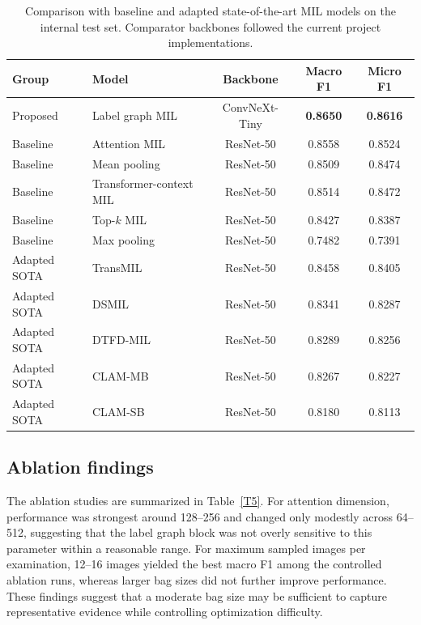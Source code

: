 \documentclass[Afour,sagev,times]{sagej}
\begin{document}
\begin{table}[h]
\small\sf\centering
\caption{Comparison with baseline and adapted state-of-the-art MIL models on the internal test set. Comparator backbones followed the current project implementations.\label{T4}}
\begin{tabular}{llccc}
\toprule
Group & Model & Backbone & Macro F1 & Micro F1 \\
\midrule
Proposed & Label graph MIL & ConvNeXt-Tiny & \textbf{0.8650} & \textbf{0.8616} \\
\midrule
Baseline & Attention MIL & ResNet-50 & 0.8558 & 0.8524 \\
Baseline & Mean pooling & ResNet-50 & 0.8509 & 0.8474 \\
Baseline & Transformer-context MIL & ResNet-50 & 0.8514 & 0.8472 \\
Baseline & Top-$k$ MIL & ResNet-50 & 0.8427 & 0.8387 \\
Baseline & Max pooling & ResNet-50 & 0.7482 & 0.7391 \\
\midrule
Adapted SOTA & TransMIL & ResNet-50 & 0.8458 & 0.8405 \\
Adapted SOTA & DSMIL & ResNet-50 & 0.8341 & 0.8287 \\
Adapted SOTA & DTFD-MIL & ResNet-50 & 0.8289 & 0.8256 \\
Adapted SOTA & CLAM-MB & ResNet-50 & 0.8267 & 0.8227 \\
Adapted SOTA & CLAM-SB & ResNet-50 & 0.8180 & 0.8113 \\
\bottomrule
\end{tabular}
\end{table}

\subsection{Ablation findings}
The ablation studies are summarized in Table~\ref{T5}. For attention dimension, performance was strongest around 128--256 and changed only modestly across 64--512, suggesting that the label graph block was not overly sensitive to this parameter within a reasonable range. For maximum sampled images per examination, 12--16 images yielded the best macro F1 among the controlled ablation runs, whereas larger bag sizes did not further improve performance. These findings suggest that a moderate bag size may be sufficient to capture representative evidence while controlling optimization difficulty.
\end{document}
